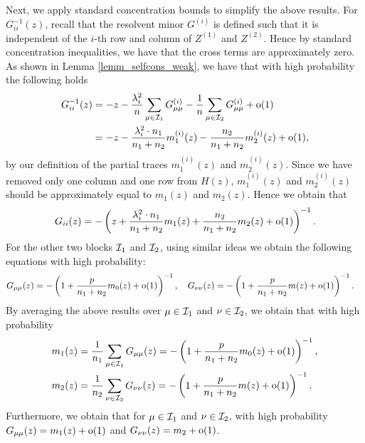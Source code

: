 Next, we apply standard concentration bounds to simplify the above results.
For $G^{-1}_{i i}(z)$, recall that the resolvent minor $G^{(i)}$ is defined such that it is independent of the $i$-th row and column of $Z^{(1)}$ and $Z^{(2)}$.
Hence by standard concentration inequalities, we have that the cross terms are approximately zero.
As shown in Lemma \ref{lemm_selfcons_weak}, we have that with high probability the following holds
\begin{align*}
	G_{ii}^{-1}(z) &= -z - \frac{\lambda_i^2}{n} \sum_{\mu \in \mathcal I_1}  G^{\left( i \right)}_{\mu\mu} - \frac{1}{n} \sum_{\mu\in \mathcal I_2} G^{\left( i \right)}_{\mu\mu} +\oo(1) \\
	&= - z - \frac{\lambda_i^2 \cdot n_1}{n_1 + n_2} m_1^{(i)}(z)-  \frac{n_2}{n_1 + n_2} m_2^{(i)}(z)+\oo(1),
\end{align*}
by our definition of the partial traces $m_1^{(i)}(z)$ and $m_2^{(i)}(z)$. %
Since we have removed only one column and one row from $H(z)$, $m_1^{(i)}(z)$ and $m_2^{(i)}(z)$ should be approximately equal to $m_1(z)$ and $m_2(z)$.
Hence we obtain that
\begin{align}\label{1self_Gii}
	G_{ii}(z)  = -\left(z + \frac{\lambda_i^2 \cdot n_1}{n_1 + n_2} m_1(z) +  \frac{n_2}{n_1 + n_2} m_2(z) + \oo(1)\right)^{-1}.
\end{align}
For the other two blocks $\cal I_1$ and $\cal I_2$, using similar ideas we obtain the following equations with high probability:
\begin{align*}
	G_{\mu\mu}(z) &= -\left(1+\frac{p}{n_1 + n_2} m_0(z) + \oo(1)\right)^{-1},\quad G_{\nu\nu}(z) = -\left(1+\frac{p}{n_1 + n_2} m(z) + \oo(1)\right)^{-1}.
\end{align*}
By averaging the above results over $\mu \in \cal I_1$ and $\nu \in \cal I_2$, we obtain that with high probability
\begin{align*}
	m_1(z) &= \frac{1}{n_1}\sum_{\mu \in \cal I_1}G_{\mu\mu}(z) = -\left(1+\frac{p}{n_1 + n_2} m_0(z) + \oo(1)\right)^{-1} ,\\
	m_2(z) &= \frac{1}{n_2}\sum_{\nu \in \cal I_2}G_{\nu\nu}(z) = -\left(1+\frac{p}{n_1 + n_2} m(z) + \oo(1)\right)^{-1}.
\end{align*}
Furthermore, we obtain that for $\mu \in \cal I_1$ and $\nu\in \cal I_2$, with high probability
$G_{\mu\mu}(z) = m_1(z) +\oo(1)$ and $G_{\nu\nu}(z) = m_2+\oo(1)$.
